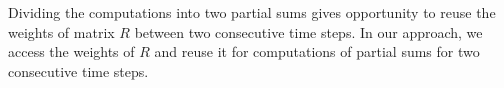 Dividing the computations into two partial sums gives opportunity to reuse the weights of matrix $R$ between two consecutive time steps. In our approach, we access the weights of $R$ and reuse it for computations of partial sums for two consecutive time steps.


